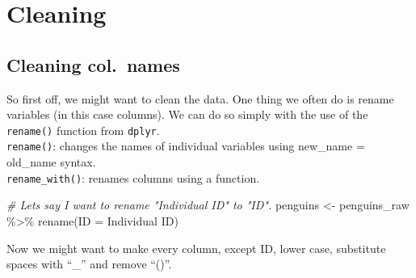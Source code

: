 \documentclass[
]{book}
\newenvironment{Shaded}{\begin{snugshade}}{\end{snugshade}}
\newcommand{\CommentTok}[1]{\textcolor[rgb]{0.56,0.35,0.01}{\textit{#1}}}
\newcommand{\FunctionTok}[1]{\textcolor[rgb]{0.00,0.00,0.00}{#1}}
\newcommand{\NormalTok}[1]{#1}
\newcommand{\OtherTok}[1]{\textcolor[rgb]{0.56,0.35,0.01}{#1}}
\newcommand{\SpecialCharTok}[1]{\textcolor[rgb]{0.00,0.00,0.00}{#1}}
\newcommand{\StringTok}[1]{\textcolor[rgb]{0.31,0.60,0.02}{#1}}
\begin{document}
\hypertarget{cleaning}{%
\section{Cleaning}\label{cleaning}}

\hypertarget{cleaning-col.-names}{%
\subsection{Cleaning col.~names}\label{cleaning-col.-names}}

So first off, we might want to clean the data.
One thing we often do is rename variables (in this case columns).
We can do so simply with the use of the \texttt{rename()} function from \texttt{dplyr}.\\
\texttt{rename()}: changes the names of individual variables using new\_name = old\_name syntax.\\
\texttt{rename\_with()}: renames columns using a function.

\begin{Shaded}
\begin{Highlighting}[]
\CommentTok{\# Lets say I want to rename "Individual ID" to "ID".}
\NormalTok{penguins }\OtherTok{\textless{}{-}}\NormalTok{ penguins\_raw }\SpecialCharTok{\%\textgreater{}\%} 
  \FunctionTok{rename}\NormalTok{(}\StringTok{\textquotesingle{}ID\textquotesingle{}} \OtherTok{=} \StringTok{\textquotesingle{}Individual ID\textquotesingle{}}\NormalTok{)}
\end{Highlighting}
\end{Shaded}

Now we might want to make every column, except ID, lower case, substitute spaces with ``\_'' and remove ``()''.
\end{document}
